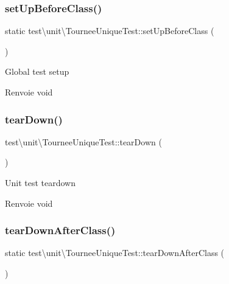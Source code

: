 \subsubsection{\texorpdfstring{set\+Up\+Before\+Class()}{setUpBeforeClass()}}
{\footnotesize\ttfamily static test\textbackslash{}unit\textbackslash{}\+Tournee\+Unique\+Test\+::set\+Up\+Before\+Class (\begin{DoxyParamCaption}{ }\end{DoxyParamCaption})\hspace{0.3cm}{\ttfamily [static]}}

Global test setup \begin{DoxyReturn}{Renvoie}
void 
\end{DoxyReturn}
\mbox{\label{classtest_1_1unit_1_1TourneeUniqueTest_a2de9d1554059563e8325ab42981f7679}} 
\subsubsection{\texorpdfstring{tear\+Down()}{tearDown()}}
{\footnotesize\ttfamily test\textbackslash{}unit\textbackslash{}\+Tournee\+Unique\+Test\+::tear\+Down (\begin{DoxyParamCaption}{ }\end{DoxyParamCaption})\hspace{0.3cm}{\ttfamily [protected]}}

Unit test teardown \begin{DoxyReturn}{Renvoie}
void 
\end{DoxyReturn}
\mbox{\label{classtest_1_1unit_1_1TourneeUniqueTest_a49de2edebe74d0ac9256be52f863200d}} 
\subsubsection{\texorpdfstring{tear\+Down\+After\+Class()}{tearDownAfterClass()}}
{\footnotesize\ttfamily static test\textbackslash{}unit\textbackslash{}\+Tournee\+Unique\+Test\+::tear\+Down\+After\+Class (\begin{DoxyParamCaption}{ }\end{DoxyParamCaption})\hspace{0.3cm}{\ttfamily [static]}}

